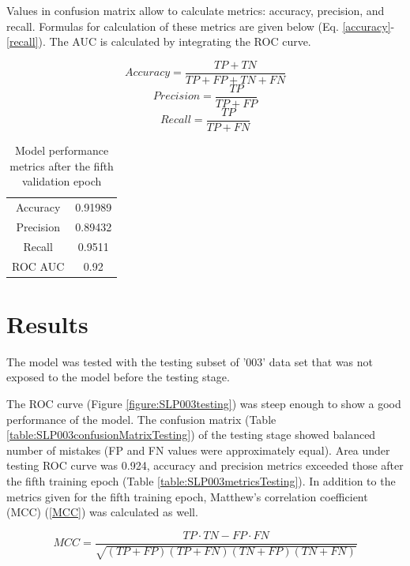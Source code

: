 \documentclass[12pt]{article}
\begin{document}
	Values in confusion matrix allow to calculate metrics: accuracy, precision,
	and recall. Formulas for calculation of these metrics are given below 
	(Eq. \ref{accuracy}-\ref{recall}).
	The AUC is calculated by integrating the ROC curve. 

	\begin{equation}
		Accuracy = \frac{TP+TN}{TP+FP+TN+FN} 
		\label{accuracy}
	\end{equation}
	\begin{equation}
		Precision = \frac{TP}{TP+FP} 
		\label{precision}
	\end{equation}
	\begin{equation}
		Recall = \frac{TP}{TP+FN} 
		\label{recall}
	\end{equation}

	\begin{table}[h!]
		\caption{Model performance metrics after the fifth validation epoch}
		\vspace{0.2cm}
		\centering
		\begin{tabular}{ | c | c | }
			\hline 
			Accuracy & 0.91989 \\
			Precision & 0.89432 \\
			Recall & 0.9511 \\  
			ROC AUC & 0.92 \\
			\hline 
		\end{tabular}
		\label{table:SLP003metricsValidation4}
	\end{table}

	\section{Results}

	The model was tested with the testing subset of '003' data set that was
	not exposed to the model before the testing stage. 

	The ROC curve (Figure \ref{figure:SLP003testing}) was steep enough to show
	a good performance of the model. The confusion matrix 
	(Table \ref{table:SLP003confusionMatrixTesting}) of the testing stage 
	showed balanced number of mistakes (FP and FN values were approximately 
	equal). Area under testing ROC curve was 0.924, 
	accuracy and precision metrics exceeded those after the fifth training 
	epoch (Table \ref{table:SLP003metricsTesting}). In addition to the metrics
	given for the fifth training epoch, Matthew's correlation coefficient (MCC)
	(\ref{MCC}) was calculated as well.

	\begin{equation}
		\label{MCC}
		MCC = \frac{TP \cdot TN - FP \cdot FN}{\sqrt{(TP+FP)(TP+FN)(TN+FP)(TN+FN)}} 
	\end{equation}
\end{document}
